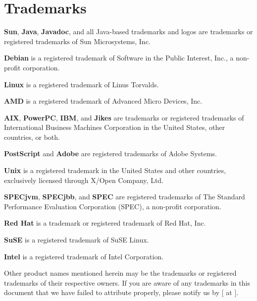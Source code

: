 \section*{Trademarks}
\label{trademarks}

{\bf Sun}, {\bf Java}, {\bf Javadoc}, and all Java-based trademarks
and logos are trademarks or registered trademarks of Sun Microsystems,
Inc. 

{\bf Debian} is a registered trademark of Software in the Public
Interest, Inc.\@, a non-profit corporation.

{\bf Linux} is a registered trademark of Linus Torvalds.

{\bf AMD} is a registered trademark of Advanced Micro Devices, Inc.

{\bf AIX}, {\bf PowerPC}, {\bf IBM}, and {\bf Jikes} are
trademarks or 
registered trademarks of International Business Machines Corporation in the
United States, other countries, or both.

{\bf PostScript} and {\bf Adobe} are registered trademarks of Adobe Systems.

{\bf Unix} is a registered trademark in the United States and other
countries, exclusively licensed through X/Open Company, Ltd.

{\bf SPECjvm}, {\bf SPECjbb}, and {\bf SPEC} are registered
trademarks of The Standard Performance Evaluation Corporation (SPEC),
a non-profit corporation. 

{\bf Red Hat} is a trademark or registered trademark of Red Hat, Inc.

{\bf SuSE} is a registered trademark of SuSE Linux.

{\bf Intel} is a registered trademark of Intel Corporation.

Other product names mentioned herein may be the trademarks or
registered trademarks of their respective owners.  If you are aware of
any trademarks in this document that we have failed to attribute
properly, please notify us by [ at {\tt \RVMBugURL}]{\RVMBugURL}.

